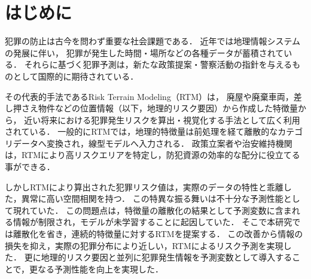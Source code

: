 \def\Style{``jsaiac.sty''}
\def\BibTeX{{\rm B\kern-.05em{\sc i\kern-.025em b}\kern-.08em%
 T\kern-.1667em\lower.7ex\hbox{E}\kern-.125emX}}
\def\JBibTeX{\leavevmode\lower .6ex\hbox{J}\kern-0.15em\BibTeX}
\def\LaTeXe{\LaTeX\kern.15em2$_{\textstyle\varepsilon}$}


\maketitle

\section{はじめに}
犯罪の防止は古今を問わず重要な社会課題である．
近年では地理情報システムの発展に伴い，
犯罪が発生した時間・場所などの各種データが蓄積されている\cite{ChicagoDataPortal}．
それらに基づく犯罪予測は，新たな政策提案・警察活動の指針を与えるものとして国際的に期待されている\cite{犯罪予測}．

その代表的手法であるRisk Terrain Modeling（RTM）\cite{caplan2015risk}は，
廃屋や廃棄車両，差し押さえ物件などの位置情報（以下，地理的リスク要因）から作成した特徴量から，
近い将来における犯罪発生リスクを算出・視覚化する手法として広く利用されている\cite{地理的犯罪予測研究の潮流}．
一般的にRTMでは，地理的特徴量は前処理を経て離散的なカテゴリデータへ変換され，線型モデルへ入力される\cite{犯罪予測, caplan2015risk}．
政策立案者や治安維持機関は，RTMにより高リスクエリアを特定し，防犯資源の効率的な配分に役立てる事ができる\cite{犯罪予測}．

しかしRTMにより算出された犯罪リスク値は，実際のデータの特性と乖離した，異常に高い空間相関を持つ．
この特異な振る舞いは不十分な予測性能として現れていた．
この問題点は，特徴量の離散化の結果として予測変数に含まれる情報が制限され，モデルが未学習することに起因していた．
そこで本研究では離散化を省き，連続的特徴量に対するRTMを提案する．
この改善から情報の損失を抑え，実際の犯罪分布により近しい，RTMによるリスク予測を実現した．
更に地理的リスク要因と並列に犯罪発生情報を予測変数として導入することで，更なる予測性能を向上を実現した．

